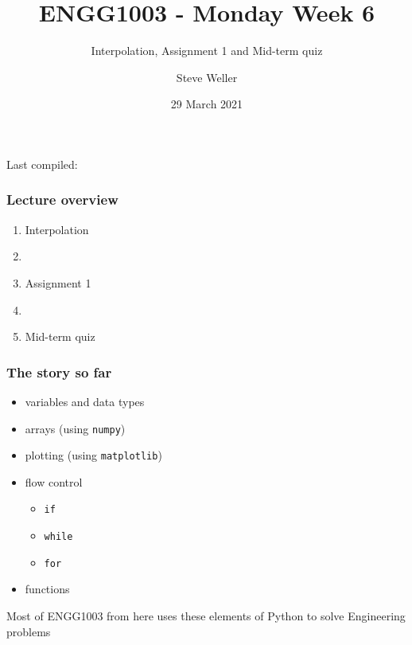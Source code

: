 \documentclass[english,14pt]{beamer}
\title{ENGG1003 - Monday Week 6}
\subtitle{Interpolation, Assignment 1 and Mid-term quiz}
\author{Steve Weller}
\institute{University of Newcastle}
\date{29 March 2021}
\begin{document}
\begin{flushleft}
{\scriptsize Last compiled:~\DTMnow}
\vspace*{-5mm}
\end{flushleft}
\framebreak


\begin{frame}[fragile]

\frametitle{Lecture overview}
\begin{enumerate}
	\item Interpolation
	\item[]
	
	\item Assignment 1
	
	\item[]
	
	\item Mid-term quiz

\end{enumerate}

\end{frame}


\begin{frame}[fragile]

\frametitle{The story so far}
\vspace*{-5mm}
\begin{itemize}
	\item variables and data types
	\item arrays (using \texttt{numpy})
	\item plotting (using \texttt{matplotlib})
	\item flow control
	\begin{itemize}
		\item \texttt{if}
		\item \texttt{while}
		\item \texttt{for}
	\end{itemize}
	\item functions
\end{itemize}
\vspace*{3mm}
Most of ENGG1003 from here uses these elements of Python to solve Engineering problems

\end{frame}

\end{document}
